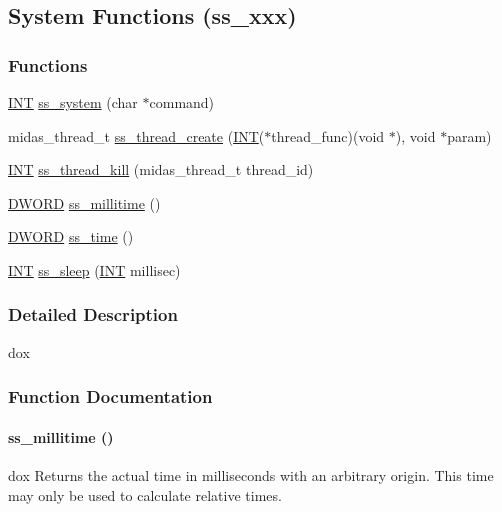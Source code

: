 \subsection{System Functions (ss\_\-xxx)}
\label{group__msfunctionc}
\subsubsection*{Functions}
\begin{DoxyCompactItemize}
\item 
\hyperlink{vppg_8h_a392e62da233ed3e2f7c3fd4f487a3896}{INT} \hyperlink{group__msfunctionc_ga9b90d0865a3eb4720bd39edcaba9edba}{ss\_\-system} (char $\ast$command)
\item 
midas\_\-thread\_\-t \hyperlink{group__msfunctionc_ga29342b1b9eaa66a0076dd0876090087d}{ss\_\-thread\_\-create} (\hyperlink{vppg_8h_a392e62da233ed3e2f7c3fd4f487a3896}{INT}($\ast$thread\_\-func)(void $\ast$), void $\ast$param)
\item 
\hyperlink{vppg_8h_a392e62da233ed3e2f7c3fd4f487a3896}{INT} \hyperlink{group__msfunctionc_gacf452572de3c2f6c5c899bc4a19aeaac}{ss\_\-thread\_\-kill} (midas\_\-thread\_\-t thread\_\-id)
\item 
\hyperlink{vt2_8h_a798af1e30bc65f319c1a246cecf59e39}{DWORD} \hyperlink{group__msfunctionc_ga999b383482224a5a6c4f5974d2625717}{ss\_\-millitime} ()
\item 
\hyperlink{vt2_8h_a798af1e30bc65f319c1a246cecf59e39}{DWORD} \hyperlink{group__msfunctionc_gab7852119bd4dc1e08aa03127d8ca008b}{ss\_\-time} ()
\item 
\hyperlink{vppg_8h_a392e62da233ed3e2f7c3fd4f487a3896}{INT} \hyperlink{group__msfunctionc_gaf877acb3de6be606dd427a84aa7b6dda}{ss\_\-sleep} (\hyperlink{vppg_8h_a392e62da233ed3e2f7c3fd4f487a3896}{INT} millisec)
\end{DoxyCompactItemize}


\subsubsection{Detailed Description}
dox 

\subsubsection{Function Documentation}
\paragraph[{ss\_\-millitime}]{ ss\_\-millitime ()}\hfill\label{group__msfunctionc_ga999b383482224a5a6c4f5974d2625717}
dox Returns the actual time in milliseconds with an arbitrary origin. This time may only be used to calculate relative times.

